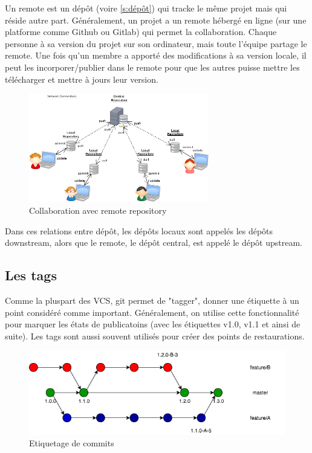 \documentclass[a4paper, 12pt]{article}
\begin{document}
    Un remote est un dépôt (voire \ref{s:dépôt}) qui tracke le même projet mais
    qui réside autre part. Généralement, un projet a un remote hébergé en ligne
    (sur une platforme comme Github ou Gitlab) qui permet la collaboration.
    Chaque personne à sa version du projet sur son ordinateur, mais toute
    l'équipe partage le remote. Une fois qu'un membre a apporté des
    modifications à sa version locale, il peut les incorporer/publier dans le
    remote pour que les autres puisse mettre les télécharger et mettre à jours
    leur version.

    \begin{figure}[H]
        \centering
        \includegraphics[width=0.7\textwidth]{figs/remotes.png}
        \caption{Collaboration avec remote repository}
        \label{fig:remotes}
    \end{figure}

    Dans ces relations entre dépôt, les dépôts locaux sont appelés les dépôts
    downstream, alors que le remote, le dépôt central, est appelé le dépôt 
    upstream.

    \subsection{Les tags}
    Comme la pluspart des VCS, git permet de "tagger", donner une étiquette à
    un point considéré comme important. Généralement, on utilise cette
    fonctionnalité pour marquer les états de publicatoins (avec les étiquettes
    v1.0, v1.1 et ainsi de suite).  Les tags sont aussi souvent utilisés pour
    créer des points de restaurations.

    \begin{figure}[H]
        \centering
        \includegraphics[width=1\textwidth]{figs/tags.png}
        \caption{Etiquetage de commits}
        \label{fig:tags}
    \end{figure}
        
\end{document}

